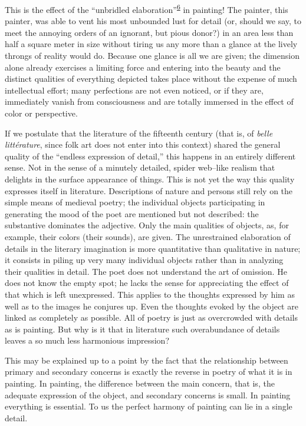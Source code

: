 This is the effect of the ``unbridled
elaboration''\textsuperscript{\protect\hypertarget{21_Chapter_Thirteen__IMAGE_AND_WORD.xhtmlux5cux23id_297}{\protect\hyperlink{23_NOTES.xhtmlux5cux23id_298}{6}}}
in painting! The painter, this painter, was able to vent his most
unbounded lust for detail (or, should we say, to meet the annoying
orders of an ignorant, but pious donor?) in an area less than half a
square meter in size without tiring us any more than a glance at the
lively throngs of reality would do. Because one glance is all we are
given; the dimension alone already exercises a limiting force and
entering into the beauty and the distinct qualities of everything
depicted takes place without the expense of much intellectual effort;
many perfections are not even noticed, or if they are, immediately
vanish from consciousness and are totally immersed in the effect of
color or perspective.

If we postulate that the literature of the fifteenth century (that is,
of \emph{belle littérature}, since folk art does not enter into this
context) shared the general quality of the ``endless expression of
detail,'' this happens in an entirely different sense. Not in the sense
of a minutely detailed, spider web--like realism that delights in the
surface appearance of things. This is not yet the way this quality
expresses itself in literature. Descriptions of nature and persons still
rely on the simple means of medieval poetry; the individual objects
participat\protect\hypertarget{21_Chapter_Thirteen__IMAGE_AND_WORD.xhtmlux5cux23page_337}{}{}ing
in generating the mood of the poet are mentioned but not described: the
substantive dominates the adjective. Only the main qualities of objects,
as, for example, their colors (their sounds), are given. The
unrestrained elaboration of details in the literary imagination is more
quantitative than qualitative in nature; it consists in piling up very
many individual objects rather than in analyzing their qualities in
detail. The poet does not understand the art of omission. He does not
know the empty spot; he lacks the sense for appreciating the effect of
that which is left unexpressed. This applies to the thoughts expressed
by him as well as to the images he conjures up. Even the thoughts evoked
by the object are linked as completely as possible. All of poetry is
just as overcrowded with details as is painting. But why is it that in
literature such overabundance of details leaves a so much less
harmonious impression?

This may be explained up to a point by the fact that the relationship
between primary and secondary concerns is exactly the reverse in poetry
of what it is in painting. In painting, the difference between the main
concern, that is, the adequate expression of the object, and secondary
concerns is small. In painting everything is essential. To us the
perfect harmony of painting can lie in a single detail.

